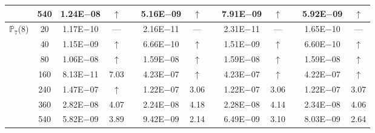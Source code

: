 \begin{table}[H]
{\begin{tabular}{@{}l c c c c c c c c c c c c@{}}
 & 540 & 1.24E$-$08 & $\uparrow$  &  & 5.16E$-$09 & $\uparrow$ &  & 7.91E$-$09 & $\uparrow$ &  & 5.92E$-$09 & $\uparrow$\\
\midrule
\multirow{7}{*}{$\mathbb{P}_{7}$(8)}
 & 20 & 1.17E$-$10 & ---  &  & 2.16E$-$11 & --- &  & 2.31E$-$11 & --- &  & 1.65E$-$10 & ---\\
 & 40 & 1.15E$-$09 & $\uparrow$  &  & 6.66E$-$10 & $\uparrow$ &  & 1.51E$-$09 & $\uparrow$ &  & 6.60E$-$10 & $\uparrow$\\
 & 80 & 1.06E$-$08 & $\uparrow$  &  & 1.59E$-$08 & $\uparrow$ &  & 1.59E$-$08 & $\uparrow$ &  & 1.59E$-$08 & $\uparrow$\\
 & 160 & 8.13E$-$11 & 7.03  &  & 4.23E$-$07 & $\uparrow$ &  & 4.23E$-$07 & $\uparrow$ &  & 4.22E$-$07 & $\uparrow$\\
 & 240 & 1.47E$-$07 & $\uparrow$  &  & 1.22E$-$07 & 3.06 &  & 1.22E$-$07 & 3.06 &  & 1.22E$-$07 & 3.07\\
 & 360 & 2.82E$-$08 & 4.07  &  & 2.24E$-$08 & 4.18 &  & 2.28E$-$08 & 4.14 &  & 2.34E$-$08 & 4.06\\
 & 540 & 5.82E$-$09 & 3.89  &  & 9.42E$-$09 & 2.14 &  & 6.49E$-$09 & 3.10 &  & 8.03E$-$09 & 2.64\\
\bottomrule
\end{tabular}}
\label{PRO:bending:02_02_glob3v2}
\end{table}
